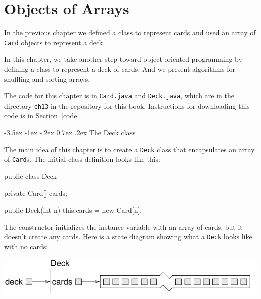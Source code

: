 \documentclass[12pt]{book}
\makeatletter
\theoremstyle{exercise}
\newcommand{\java}[1]{\verb"#1"}
\renewcommand{\section}{\@startsection{section}{1}{\z@}%
    {-3.5ex \@plus -1ex \@minus -.2ex}%
    {0.7ex \@plus.2ex}%
    {\normalfont\Large\bfseries}}
\newcommand{\java}[1]{\lstinline{#1}} %
\makeatother
\begin{document}


\chapter{Objects of Arrays}
\label{Deck}

In the previous chapter we defined a class to represent cards and used an array of \java{Card} objects to represent a deck.

In this chapter, we take another step toward object-oriented programming by defining a class to represent a deck of cards.
And we present algorithms for shuffling and sorting arrays.



The code for this chapter is in \java{Card.java} and \java{Deck.java}, which are in the directory {\tt ch13} in the repository for this book.
Instructions for downloading this code is in Section~\ref{code}.


\section{The Deck class}
\label{deck}

The main idea of this chapter is to create a \java{Deck} class that encapsulates an array of \java{Card}s.
The initial class definition looks like this:

\begin{code}
public class Deck {
    private Card[] cards;

    public Deck(int n) {
        this.cards = new Card[n];
    }
}
\end{code}


The constructor initializes the instance variable with an array of cards, but it doesn't create any cards.
Here is a state diagram showing what a \java{Deck} looks like with no cards:

\begin{center}
\includegraphics{figs/deckobject.pdf}
\end{center}
\end{document}
